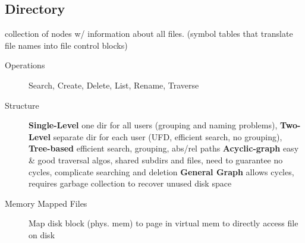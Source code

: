\subsection*{Directory}
collection of nodes w/ information about all files. (symbol tables that translate file names into file control blocks)
\begin{description}
    \item[Operations]Search, Create, Delete, List, Rename, Traverse
    \item[Structure] \textbf{Single-Level} one dir for all users (grouping and naming problems), \textbf{Two-Level} separate dir for each user (UFD, efficient search, no grouping), \textbf{Tree-based} efficient search, grouping, abs/rel paths \textbf{Acyclic-graph} easy \& good traversal algos, shared subdirs and files, need to guarantee no cycles, complicate searching and deletion \textbf{General Graph} allows cycles, requires garbage collection to recover unused disk space %
    \item[Memory Mapped Files] Map disk block (phys. mem) to page in virtual mem to directly access file on disk
\end{description}

